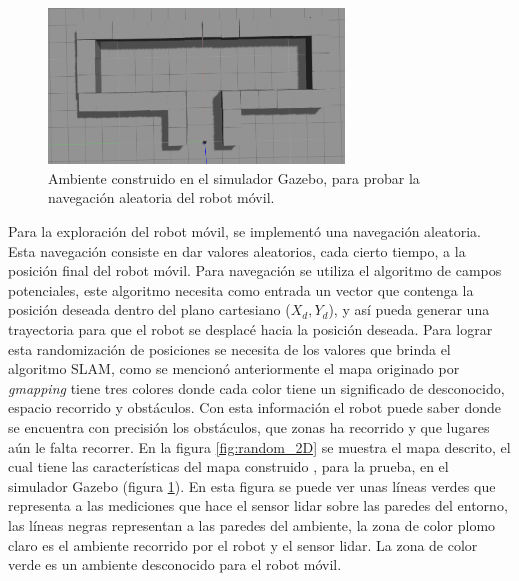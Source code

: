 \begin{figure}
  \centering \footnotesize
  \includegraphics[width=0.70\textwidth]{images/mapa_gazebo.png}
  \captionsetup{font=footnotesize}
  \caption{Ambiente construido en el simulador Gazebo, para probar la navegación aleatoria del robot móvil.}
  \label{fig:random_Gazebo}
\end{figure}
Para la exploración del robot móvil, se implementó una navegación aleatoria. Esta navegación 
consiste en dar valores aleatorios, cada cierto tiempo, a la posición final del robot móvil. Para 
navegación se utiliza el algoritmo de campos potenciales, este algoritmo necesita como entrada 
un vector que contenga la posición deseada dentro del plano cartesiano ($X_{d}, Y_{d}$), y así 
pueda generar una trayectoria para que el robot se desplacé hacia la posición deseada. Para 
lograr esta randomización de posiciones se necesita de los valores que brinda el algoritmo 
SLAM, como se mencionó anteriormente el mapa originado por \textit{gmapping} tiene tres colores 
donde cada color tiene un significado de desconocido, espacio recorrido y obstáculos. Con 
esta información el robot puede saber donde se encuentra con precisión los obstáculos, que 
zonas ha recorrido y que lugares aún le falta recorrer. En la figura \ref{fig:random_2D} se 
muestra el mapa descrito, el cual tiene las características del mapa construido , para la 
prueba, en el simulador Gazebo (figura \ref{fig:random_Gazebo}). En esta figura se puede ver 
unas líneas verdes que representa a las mediciones que hace el sensor lidar sobre las paredes 
del entorno, las líneas negras representan a las paredes del ambiente, la zona de color plomo 
claro es el ambiente recorrido por el robot y el sensor lidar. La zona de color verde es un 
ambiente desconocido para el robot móvil. 
